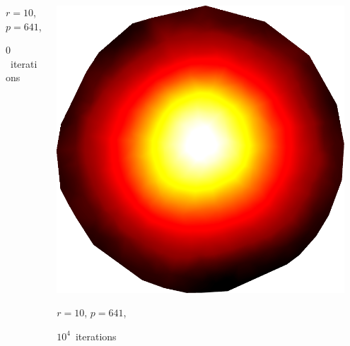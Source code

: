 \documentclass[aspectratio=169,t]{beamer}
\begin{document}
{\begin{columns}
\begin{column}{0.22\textwidth}
			{\footnotesize 
				\par \vspace{-1mm} $r=10$, $p=641$,
				\par \vspace{-1mm} $0$~iterations
			}
		\end{column}
		\begin{column}{0.22\textwidth}
			\centering
			\includegraphics[width=.85\textwidth]{data/synthetic_meshes/random_circle_tessellation_Dirac_delta_10_v641_f1252_funcvals_10000iter.png}
			{\footnotesize 
				\par \vspace{-1mm} $r=10$, $p=641$,
				\par \vspace{-1mm} $10^4$~iterations
			}
		\end{column}
		\begin{column}{0.17\textwidth}~\end{column}
	\end{columns}
}
\end{document}
